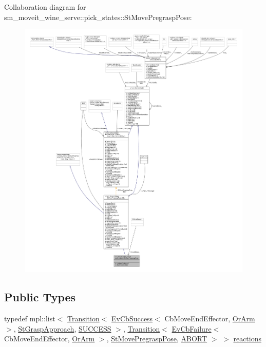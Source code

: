 Collaboration diagram for sm\+\_\+moveit\+\_\+wine\+\_\+serve\+:\+:pick\+\_\+states\+:\+:St\+Move\+Pregrasp\+Pose\+:
\nopagebreak
\begin{figure}[H]
\begin{center}
\leavevmode
\includegraphics[width=350pt]{structsm__moveit__wine__serve_1_1pick__states_1_1StMovePregraspPose__coll__graph}
\end{center}
\end{figure}
\subsection*{Public Types}
\begin{DoxyCompactItemize}
\item 
typedef mpl\+::list$<$ \hyperlink{classsmacc_1_1Transition}{Transition}$<$ \hyperlink{structsmacc_1_1EvCbSuccess}{Ev\+Cb\+Success}$<$ Cb\+Move\+End\+Effector, \hyperlink{classsm__moveit__wine__serve_1_1OrArm}{Or\+Arm} $>$, \hyperlink{structsm__moveit__wine__serve_1_1pick__states_1_1StGraspApproach}{St\+Grasp\+Approach}, \hyperlink{structsmacc_1_1default__transition__tags_1_1SUCCESS}{S\+U\+C\+C\+E\+SS} $>$, \hyperlink{classsmacc_1_1Transition}{Transition}$<$ \hyperlink{structsmacc_1_1EvCbFailure}{Ev\+Cb\+Failure}$<$ Cb\+Move\+End\+Effector, \hyperlink{classsm__moveit__wine__serve_1_1OrArm}{Or\+Arm} $>$, \hyperlink{structsm__moveit__wine__serve_1_1pick__states_1_1StMovePregraspPose}{St\+Move\+Pregrasp\+Pose}, \hyperlink{structsmacc_1_1default__transition__tags_1_1ABORT}{A\+B\+O\+RT} $>$ $>$ \hyperlink{structsm__moveit__wine__serve_1_1pick__states_1_1StMovePregraspPose_aa46f2ef812aaadc6815e623701534fef}{reactions}
\end{DoxyCompactItemize}
